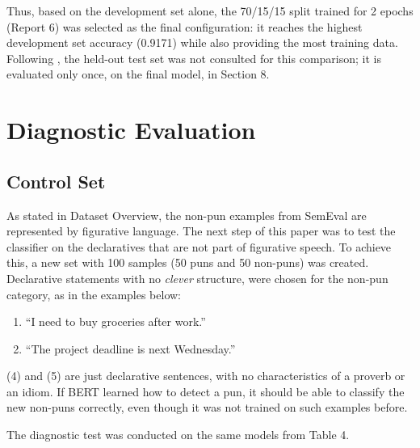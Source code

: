 \documentclass[11pt,a4paper]{article}
\begin{document}
Thus, based on the development set alone, the 70/15/15 split trained for 2 epochs (Report 6) was selected as the final configuration: it reaches the highest development set accuracy (0.9171) while also providing the most training data. Following \citet{jurafsky2025slp}, the held-out test set was not consulted for this comparison; it is evaluated only once, on the final model, in Section 8.

 
\section{Diagnostic Evaluation}

\subsection{Control Set}

As stated in Dataset Overview, the non-pun examples from SemEval are represented by figurative language. The next step of this paper was to test the classifier on the  declaratives that are not part of figurative speech. To achieve this, a new set with 100 samples (50 puns and 50 non-puns) was created. Declarative statements with no \textit{clever} structure, were chosen for the non-pun category, as in the examples below:

\begin{enumerate}
    \item[(4)] ``I need to buy groceries after work.'' 
    \item[(5)] ``The project deadline is next Wednesday.''
\end{enumerate}

(4) and (5) are just declarative sentences, with no characteristics of a proverb or an idiom. If BERT learned how to detect a pun, it should be able to classify the new non-puns correctly, even though it was not trained on such examples before.  
\vspace{4pt}

The diagnostic test was conducted on the same models from Table 4. 
\vspace{4pt}
\end{document}
